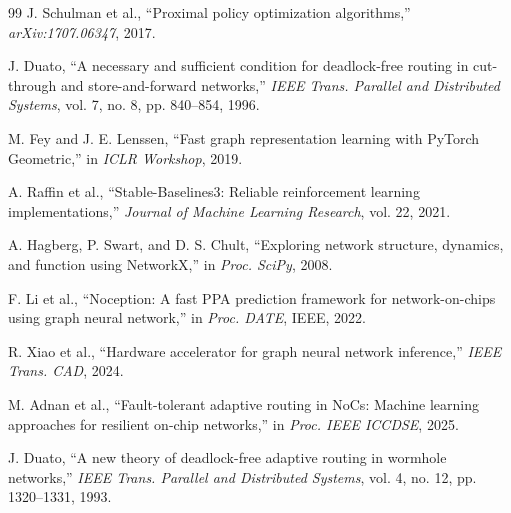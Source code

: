 \documentclass[conference]{IEEEtran}
\begin{document}
\begin{thebibliography}{99}
J. Schulman et al., ``Proximal policy optimization algorithms,'' \textit{arXiv:1707.06347}, 2017.

J. Duato, ``A necessary and sufficient condition for deadlock-free routing in cut-through and store-and-forward networks,'' \textit{IEEE Trans. Parallel and Distributed Systems}, vol. 7, no. 8, pp. 840--854, 1996.

M. Fey and J. E. Lenssen, ``Fast graph representation learning with PyTorch Geometric,'' in \textit{ICLR Workshop}, 2019.

A. Raffin et al., ``Stable-Baselines3: Reliable reinforcement learning implementations,'' \textit{Journal of Machine Learning Research}, vol. 22, 2021.

A. Hagberg, P. Swart, and D. S. Chult, ``Exploring network structure, dynamics, and function using NetworkX,'' in \textit{Proc. SciPy}, 2008.

F. Li et al., ``Noception: A fast PPA prediction framework for network-on-chips using graph neural network,'' in \textit{Proc. DATE}, IEEE, 2022.

R. Xiao et al., ``Hardware accelerator for graph neural network inference,'' \textit{IEEE Trans. CAD}, 2024.

M. Adnan et al., ``Fault-tolerant adaptive routing in NoCs: Machine learning approaches for resilient on-chip networks,'' in \textit{Proc. IEEE ICCDSE}, 2025.

J. Duato, ``A new theory of deadlock-free adaptive routing in wormhole networks,'' \textit{IEEE Trans. Parallel and Distributed Systems}, vol. 4, no. 12, pp. 1320--1331, 1993.

\end{thebibliography}
\end{document}
